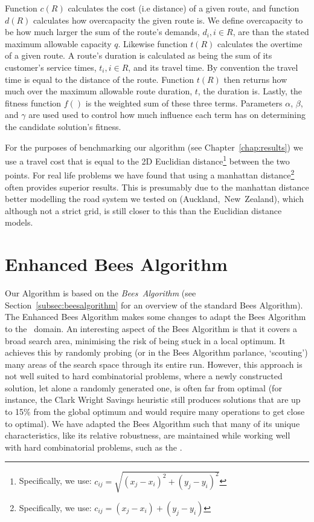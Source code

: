 Function $c(R)$ calculates the cost (i.e distance) of a given route, and function $d(R)$ calculates how overcapacity the given route is. We define overcapacity to be how much larger the sum of the route's demands, $d_i, i \in R$, are than the stated maximum allowable capacity $q$. Likewise function $t(R)$ calculates the overtime of a given route. A route's duration is calculated as being the sum of its customer's service times, $t_i, i \in R$, and its travel time. By convention the travel time is equal to the distance of the route. Function $t(R)$ then returns how much over the maximum allowable route duration, $t$, the duration is. Lastly, the fitness function $f()$ is the weighted sum of these three terms. Parameters $\alpha$, $\beta$, and $\gamma$ are used used to control how much influence each term has on determining the candidate solution's fitness.

For the purposes of benchmarking our algorithm (see Chapter~\ref{chap:results}) we use a travel cost that is equal to the 2D Euclidian distance\footnote{Specifically, we use: $c_{ij} = \sqrt{(x_j-x_i)^2 + (y_j-y_i)^2}$} between the two points. For real life problems we have found that using a manhattan distance\footnote{Specifically, we use: $c_{ij} = (x_j-x_i) + (y_j-y_i)$} often provides superior results. This is presumably due to the manhattan distance better modelling the road system we tested on (Auckland,~New~Zealand), which although not a strict grid, is still closer to this than the Euclidian distance models.

\section{Enhanced Bees Algorithm}
\label{sec:enhancedbeesalgorithm}

Our Algorithm is based on the \emph{Bees~Algorithm} (see Section~\ref{subsec:beesalgorithm} for an overview of the standard Bees Algorithm). The Enhanced Bees Algorithm makes some changes to adapt the Bees Algorithm to the \VRP\ domain. An interesting aspect of the Bees Algorithm is that it covers a broad search area, minimising the risk of being stuck in a local optimum. It achieves this by randomly probing (or in the Bees Algorithm parlance, `scouting') many areas of the search space through its entire run. However, this approach is not well suited to hard combinatorial problems, where a newly constructed solution, let alone a randomly generated one, is often far from optimal (for instance, the Clark Wright Savings heuristic still produces solutions that are up to 15\% from the global optimum and would require many operations to get close to optimal). We have adapted the Bees Algorithm such that many of its unique characteristics, like its relative robustness, are maintained while working well with hard combinatorial problems, such as the \VRP.


